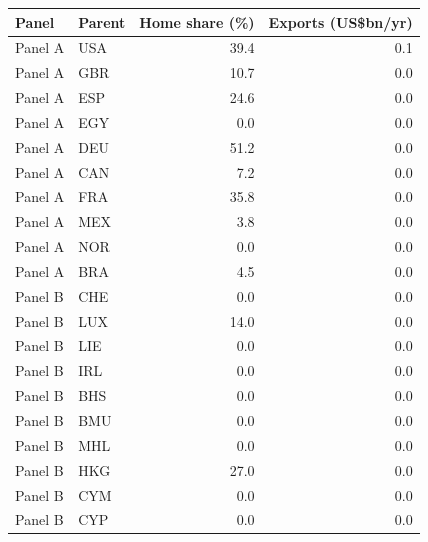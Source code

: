 \begin{tabular}{llrr}
\toprule
Panel & Parent & Home share (\%) & Exports (US\$bn/yr) \\
\midrule
Panel A & USA & 39.4 & 0.1 \\
Panel A & GBR & 10.7 & 0.0 \\
Panel A & ESP & 24.6 & 0.0 \\
Panel A & EGY & 0.0 & 0.0 \\
Panel A & DEU & 51.2 & 0.0 \\
Panel A & CAN & 7.2 & 0.0 \\
Panel A & FRA & 35.8 & 0.0 \\
Panel A & MEX & 3.8 & 0.0 \\
Panel A & NOR & 0.0 & 0.0 \\
Panel A & BRA & 4.5 & 0.0 \\
\midrule
Panel B & CHE & 0.0 & 0.0 \\
Panel B & LUX & 14.0 & 0.0 \\
Panel B & LIE & 0.0 & 0.0 \\
Panel B & IRL & 0.0 & 0.0 \\
Panel B & BHS & 0.0 & 0.0 \\
Panel B & BMU & 0.0 & 0.0 \\
Panel B & MHL & 0.0 & 0.0 \\
Panel B & HKG & 27.0 & 0.0 \\
Panel B & CYM & 0.0 & 0.0 \\
Panel B & CYP & 0.0 & 0.0 \\
\bottomrule
\end{tabular}
